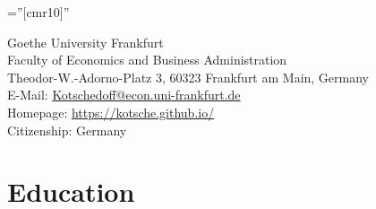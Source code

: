 \documentclass[a4paper,10pt]{article} %
\begin{document}
\pagestyle{empty} %

\font\fb=''[cmr10]'' %


\par{\bigskip\par} %


\begin{center}
Goethe University Frankfurt \\
Faculty of Economics and Business Administration \\
Theodor-W.-Adorno-Platz 3, 60323 Frankfurt am Main, Germany  \\
E-Mail: \href{mailto:Kotschedoff@econ.uni-frankfurt.de}{Kotschedoff@econ.uni-frankfurt.de} \\
Homepage: \url{https://kotsche.github.io/} \\
Citizenship: Germany \\
\end{center}
 
  



\section{Education}
\end{document}

